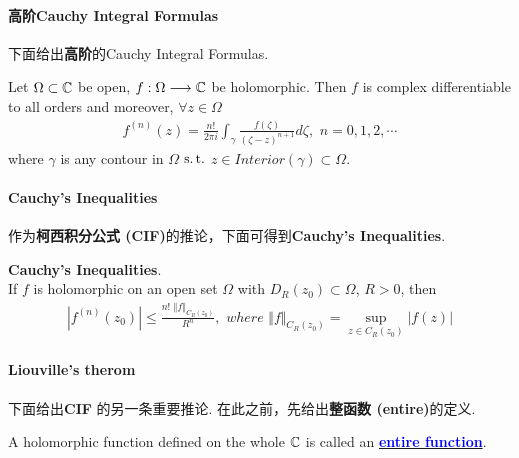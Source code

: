 \paragraph{高阶Cauchy Integral Formulas}
	下面给出\textbf{高阶}的Cauchy Integral Formulas.
	\begin{thm}\label{thm 5.2.2}
		Let $\Omega \subset \mathbb{C}$ be open, $f : \Omega \longrightarrow \mathbb{C}$ be holomorphic. Then $f$ is complex differentiable to all orders and moreover, $\forall z \in \Omega$
		\begin{align}
			f^{(n)}(z) = \frac{n!}{2 \pi i} \int_{\gamma}{\frac{f(\zeta)}{(\zeta - z)^{n + 1}} d\zeta} , \,\, n = 0 , 1 , 2 , \cdots
		\end{align}
		where $\gamma$ is any contour in $\Omega$ $\operatorname{s.t.}$ $z \in Interior(\gamma) \subset \Omega$.
	\end{thm}

\vspace{2em}
\paragraph{\textbf{Cauchy's Inequalities}}
	作为\textbf{柯西积分公式 (CIF)}的推论，下面可得到\textbf{Cauchy's Inequalities}.
	\begin{corollary}\label{cor 5.2.3}
		\textbf{Cauchy's Inequalities}.\\
		If $f$ is holomorphic on an open set $\Omega$ with $D_{R}(z_0) \subset \Omega$, $R > 0$, then
		\begin{align}
			\left| f^{(n)}(z_0) \right| \leq \frac{n! \,\, \Vert f \Vert_{C_{R}(z_0)}}{R^n} , \,\, where \,\, \Vert f \Vert_{C_{R}(z_0)} = \sup_{z \in C_{R}(z_0)}{\left| f(z) \right|}
		\end{align}
	\end{corollary}

\vspace{2em}
\paragraph{\textbf{Liouville's therom}}
	下面给出\textbf{CIF} 的另一条重要推论. 在此之前，先给出\textbf{整函数 (entire)}的定义.
	\begin{defn}\label{def 5.2.1}
		A holomorphic function defined on the whole $\mathbb{C}$ is called an \underline{\textcolor{blue}{\textbf{entire function}}}.
	\end{defn}

